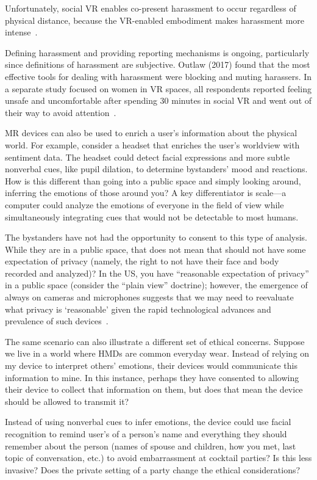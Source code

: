 Unfortunately, social VR enables co-present harassment to occur regardless of physical distance, because the VR-enabled embodiment  makes harassment more intense~\cite{blackwell}.

Defining harassment and providing reporting mechanisms is ongoing, particularly since definitions of harassment are subjective. Outlaw (2017) found that the most effective tools for dealing with harassment were blocking and muting harassers. In a separate study focused on women in VR spaces, all respondents reported feeling unsafe and uncomfortable after spending 30 minutes in social VR and went out of their way to avoid attention~\cite{outlaw2017}.

MR devices can also be used to enrich a user's information about the physical world. For example, consider a headset that enriches the user's worldview with sentiment data. The headset could detect facial expressions and more subtle nonverbal cues, like pupil dilation, to determine bystanders' mood and reactions. How is this different than going into a public space and simply looking around, inferring the emotions of those around you? A key differentiator is scale---a computer could analyze the emotions of everyone in the field of view while simultaneously integrating cues that would not be detectable to most humans.

The bystanders have not had the opportunity to consent to this type of analysis. While they are in a public space, that does not mean that should not have some expectation of privacy (namely, the right to not have their face and body recorded and analyzed)? In the US, you have ``reasonable expectation of privacy'' in a public space (consider the ``plain view'' doctrine); however, the emergence of always on cameras and microphones suggests that we may need to reevaluate what privacy is `reasonable' given the rapid technological advances and prevalence of such devices~\cite{bellotti1993design}.

The same scenario can also illustrate a different set of ethical concerns. Suppose we live in a world where HMDs are common everyday wear. Instead of relying on my device to interpret others' emotions, their devices would communicate this information to mine. In this instance, perhaps they have consented to allowing their device to collect that information on them, but does that mean the device should be allowed to transmit it?

Instead of using nonverbal cues to infer emotions, the device could use facial recognition to remind user's of a person's name and everything they should remember about the person (names of spouse and children, how you met, last topic of conversation, etc.) to avoid embarrassment at cocktail parties\cite{wassom2014augmented}? Is this less invasive? Does the private setting of a party change the ethical considerations?

